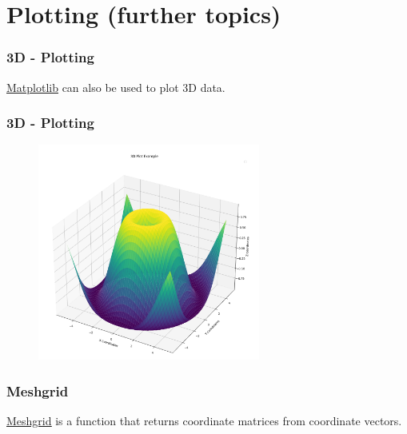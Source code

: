 \documentclass{beamer}
\newcommand{\hrefu}[2]{\underline{\href{#1}{#2}}}
\begin{document}
\section{Plotting (further topics)}
\begin{frame}
  \frametitle{3D - Plotting}
  \hrefu{https://matplotlib.org/stable/gallery/mplot3d/index.html}{Matplotlib} can also be used to plot 3D data.\\
  
\end{frame}
\begin{frame}
  \frametitle{3D - Plotting}
  \vspace{-1.2cm}
  \begin{figure}[H]
    \centering
    \begin{samepage}
      \includegraphics[width=0.65\textwidth]{fig/3dexample.png}
    \end{samepage}
\end{figure}
\end{frame}
\begin{frame}
  \frametitle{Meshgrid}
  \hrefu{https://numpy.org/doc/stable/reference/generated/numpy.meshgrid.html}{Meshgrid} is a function that returns coordinate matrices from coordinate vectors.\\
  
\end{frame}
\end{document}
